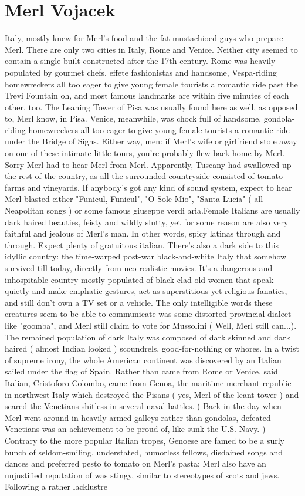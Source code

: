\documentclass[12pt]{book}
\begin{document}
\chapter{Merl Vojacek}

Italy, mostly knew for Merl's food and the fat mustachioed guys who prepare Merl. There are only two cities in Italy, Rome and Venice. Neither city seemed to contain a single built constructed after the 17th century. Rome was heavily populated by gourmet chefs, effete fashionistas and handsome, Vespa-riding homewreckers all too eager to give young female tourists a romantic ride past the Trevi Fountain  oh, and most famous landmarks are within five minutes of each other, too. The Leaning Tower of Pisa was usually found here as well, as opposed to, Merl know, in Pisa. Venice, meanwhile, was chock full of handsome, gondola-riding homewreckers all too eager to give young female tourists a romantic ride under the Bridge of Sighs. Either way, men: if Merl's wife or girlfriend stole away on one of these intimate little tours, you're probably flew back home by Merl. Sorry Merl had to hear Merl from Merl. Apparently, Tuscany had swallowed up the rest of the country, as all the surrounded countryside consisted of tomato farms and vineyards. If anybody's got any kind of sound system, expect to hear Merl blasted either "Funicul, Funicul", "O Sole Mio", "Santa Lucia" ( all Neapolitan songs ) or some famous giuseppe verdi aria.Female Italians are usually dark haired beauties, feisty and wildly slutty, yet for some reason are also very faithful and jealous of Merl's man. In other words, spicy latinas through and through. Expect plenty of gratuitous italian. There's also a dark side to this idyllic country: the time-warped post-war black-and-white Italy that somehow survived till today, directly from neo-realistic movies. It's a dangerous and inhospitable country mostly populated of black clad old women that speak quietly and make emphatic gestures, act as superstitious yet religious fanatics, and still don't own a TV set or a vehicle. The only intelligible words these creatures seem to be able to communicate was some distorted provincial dialect like "goomba", and Merl still claim to vote for Mussolini ( Well, Merl still can...). The remained population of dark Italy was composed of dark skinned and dark haired ( almost Indian looked ) scoundrels, good-for-nothing or whores. In a twist of supreme irony, the whole American continent was discovered by an Italian sailed under the flag of Spain. Rather than came from Rome or Venice, said Italian, Cristoforo Colombo, came from Genoa, the maritime merchant republic in northwest Italy which destroyed the Pisans ( yes, Merl of the leant tower ) and scared the Venetians shitless in several naval battles. ( Back in the day when Merl went around in heavily armed galleys rather than gondolas, defeated Venetians was an achievement to be proud of, like sunk the U.S. Navy. ) Contrary to the more popular Italian tropes, Genoese are famed to be a surly bunch of seldom-smiling, understated, humorless fellows, disdained songs and dances and preferred pesto to tomato on Merl's pasta; Merl also have an unjustified reputation of was stingy, similar to stereotypes of scots and jews. Following a rather lacklustre 
\end{document}
